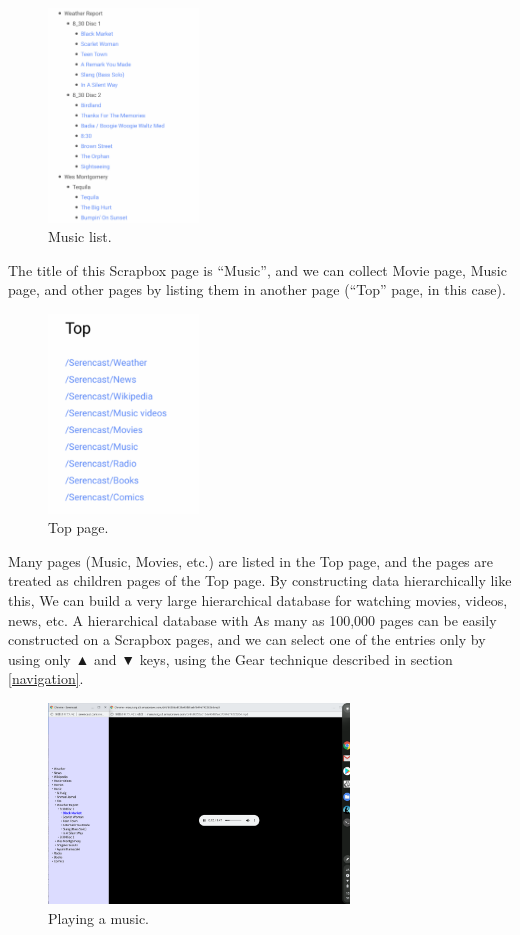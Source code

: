 \documentclass{article}
\def\up{▲}
\def\down{▼}
\def\SB{\textsf{\small Scrapbox}}
\begin{document}
\begin{figure}[H]
\centerline{\includegraphics[width=40mm,bb=0 0 652 926]{figures/d8fe8ff8f3e1bbcb34cf51e268592f8c.png}}
\caption{Music list.}
\label{musiclist}
\end{figure}

The title of this {\SB} page is ``Music'', and 
we can collect Movie page, Music page, and other pages by
listing them in another page (``Top'' page, in this case).

\begin{figure}[H]
\centerline{\includegraphics[width=40mm,bb=0 0 396 523]{figures/8a8e4d63b75183f1b4d0ed4db733f500.png}}
\caption{Top page.}
\label{top}
\end{figure}

Many pages (Music, Movies, etc.) are listed in the Top page, and
the pages are treated as children pages of the Top page.
By constructing data hierarchically like this,
We can build a very large hierarchical database for watching movies, videos, news, etc.
A hierarchical database with
As many as 100,000 pages can be easily constructed on a {\SB} pages, and
we can select one of the entries only by using only {\up} and {\down} keys,
using the Gear technique described in section \ref{navigation}.

\begin{figure}[H]
\centerline{\includegraphics[width=80mm,bb=0 0 2400 1600]{figures/blackmarket.png}}
\caption{Playing a music.}
\label{blackmarket}
\end{figure}
\end{document}
